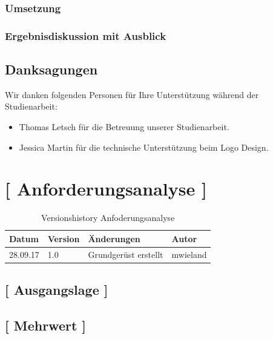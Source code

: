 \documentclass[11pt,a4paper,english,oneside]{book}
\numberwithin{equation}{chapter}
\begin{document}
	\subsection*{Umsetzung}
	
	\subsection*{Ergebnisdiskussion mit Ausblick}
	
	\newpage
	
	\section*{Danksagungen}
	\thispagestyle{firststyle}
	
	Wir danken folgenden Personen für Ihre Unterstützung während der Studienarbeit:
	
	\begin{itemize}
		\item Thomas Letsch für die Betreuung unserer Studienarbeit.
		\item Jessica Martin für die technische Unterstützung beim Logo Design.
	\end{itemize}
	
	\tableofcontents
	
	\newpage
	\chapter{[ Anforderungsanalyse ]}
	
	\begin{table}[h!]
		\centering
		\begin{tabularx}{\linewidth}{l l X l}
			\toprule 
			Datum & Version & Änderungen & Autor \\
			\midrule
			28.09.17 & 1.0 & Grundgerüst erstellt & mwieland \\
			\bottomrule 
		\end{tabularx} 
		\caption{Versionshistory Anfoderungsanalyse} 
	\end{table}
	
	\section{[ Ausgangslage ]}
	
	\section{[ Mehrwert ]}
	
\end{document}
